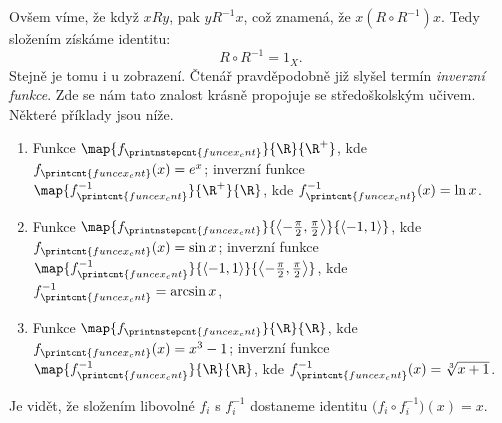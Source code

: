 Ovšem víme, že když $xRy$, pak $yR^{-1}x$, což znamená, že $x(R\circ R^{-1})x$. Tedy složením získáme identitu:
\begin{equation*}
    R\circ R^{-1}=1_X.
\end{equation*}
Stejně je tomu i u zobrazení. Čtenář pravděpodobně již slyšel termín \emph{inverzní funkce}. Zde se nám tato znalost krásně propojuje se středoškolským učivem. Některé příklady jsou níže.
\begin{enumerate}[label=(\roman*)]
\item Funkce $\map{f_{\printnstepcnt{funcex_cnt}}}{\R}{\R^+}$, kde $f_{\printcnt{funcex_cnt}}(x)=e^x$; inverzní funkce $\map{f_{\printcnt{funcex_cnt}}^{-1}}{\R^+}{\R}$, kde $f_{\printcnt{funcex_cnt}}^{-1}(x)=\ln{x}$.
\item \sloppy Funkce $\map{f_{\printnstepcnt{funcex_cnt}}}{\left\langle-\frac{\pi}{2},\frac{\pi}{2}\right\rangle}{\langle-1,1\rangle}$, kde $f_{\printcnt{funcex_cnt}}(x)=\sin{x}$; inverzní funkce ${\map{f_{\printcnt{funcex_cnt}}^{-1}}{\langle-1,1\rangle}{\left\langle-\frac{\pi}{2},\frac{\pi}{2}\right\rangle}}$, kde $f_{\printcnt{funcex_cnt}}^{-1}=\arcsin{x}$,
\item Funkce $\map{f_{\printnstepcnt{funcex_cnt}}}{\R}{\R}$, kde $f_{\printcnt{funcex_cnt}}(x)=x^3-1$; inverzní funkce $\map{f_{\printcnt{funcex_cnt}}^{-1}}{\R}{\R}$, kde $f_{\printcnt{funcex_cnt}}^{-1}(x)=\sqrt[3]{x+1}$.
\end{enumerate}
Je vidět, že složením libovolné $f_i$ s $f_i^{-1}$ dostaneme identitu $\big(f_i\circ f_i^{-1}\big)(x)=x$.\par
\medskip

